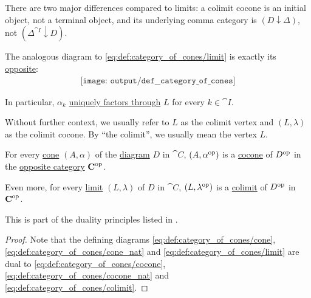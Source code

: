 \begin{definition}
\begin{thmenum}
    There are two major differences compared to limits: a colimit cocone is an initial object, not a terminal object, and its underlying comma category is \( (D \downarrow \Delta) \), not \( (\Delta^{\cat{I}} \downarrow D) \).

    The analogous diagram to \eqref{eq:def:category_of_cones/limit} is exactly its \hyperref[thm:categorical_principle_of_duality]{opposite}:
    \begin{equation}\label{eq:def:category_of_cones/colimit}
      \begin{aligned}
        \texttt{[image: output/def\_\_category\_of\_cones]}
      \end{aligned}
    \end{equation}

    In particular, \( \alpha_k \) \hyperref[def:factors_through]{uniquely factors through} \( L \) for every \( k \in \cat{I} \).

    Without further context, we usually refer to \( L \) as the colimit vertex and \( (L, \lambda) \) as the colimit cocone. By \enquote{the colimit}, we usually mean the vertex \( L \).
  \end{thmenum}
\end{definition}

\begin{proposition}\label{thm:categorical_limit_duality}
  For every \hyperref[def:category_of_cones/cone]{cone} \( (A, \alpha) \) of the \hyperref[def:categorical_diagram]{diagram} \( D \) in \( \cat{C} \), \( (A, \alpha^{\operatorname{op}}) \) is a \hyperref[def:category_of_cones/cone]{cocone} of \( D^{\operatorname{op}} \) in the \hyperref[def:opposite_category]{opposite category} \( \operatorname{\mathbf{C}}^{\operatorname{op}} \).

  Even more, for every \hyperref[def:category_of_cones/limit]{limit} \( (L, \lambda) \) of \( D \) in \( \cat{C} \), \( (L, \lambda^{\operatorname{op}}) \) is a \hyperref[def:category_of_cones/colimit]{colimit} of \( D^{\operatorname{op}} \) in \( \operatorname{\mathbf{C}}^{\operatorname{op}} \).

  This is part of the duality principles listed in .
\end{proposition}
\begin{proof}
  Note that the defining diagrams \eqref{eq:def:category_of_cones/cone}, \eqref{eq:def:category_of_cones/cone_nat} and \eqref{eq:def:category_of_cones/limit} are dual to \eqref{eq:def:category_of_cones/cocone}, \eqref{eq:def:category_of_cones/cocone_nat} and \eqref{eq:def:category_of_cones/colimit}.
\end{proof}

